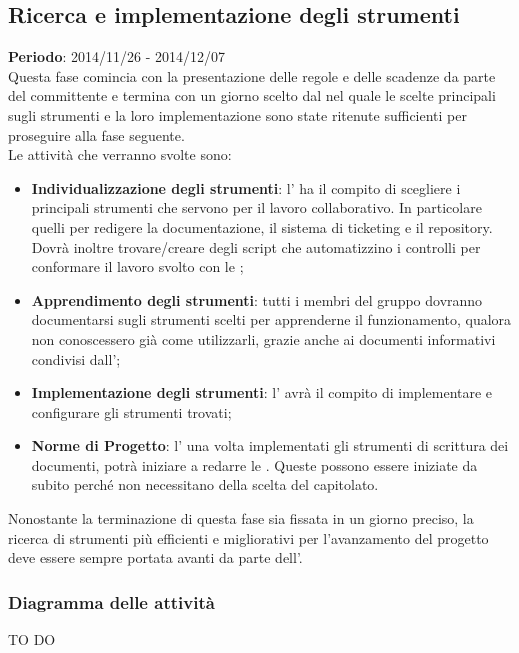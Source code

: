 	\subsection{Ricerca e implementazione degli strumenti} %
	\label{sub:ricerca_e_implementazione_degli_strumenti}
	\textbf{Periodo}: 2014/11/26 - 2014/12/07 \\
	Questa fase comincia con la presentazione delle regole e delle scadenze da parte del committente e termina con un giorno scelto dal \roleProjectManager{} nel quale le scelte principali sugli strumenti e la loro implementazione sono state ritenute sufficienti per proseguire alla fase seguente. \\
	Le attività che verranno svolte sono:
		\begin{itemize}
			\item \textbf{Individualizzazione degli strumenti}: l'\roleAdministrator{} ha il compito di scegliere i principali strumenti che servono per il lavoro collaborativo. In particolare quelli per redigere la documentazione, il sistema di ticketing e il repository. Dovrà inoltre trovare/creare degli script che automatizzino i controlli per conformare il lavoro svolto con le \docNameVersionNdP;
			\item \textbf{Apprendimento degli strumenti}: tutti i membri del gruppo dovranno documentarsi sugli strumenti scelti per apprenderne il funzionamento, qualora non conoscessero già come utilizzarli, grazie anche ai documenti informativi condivisi dall'\roleAdministrator;
			\item \textbf{Implementazione degli strumenti}: l'\roleAdministrator{} avrà il compito di implementare e configurare gli strumenti trovati;
			\item \textbf{Norme di Progetto}: l'\roleAdministrator{} una volta implementati gli strumenti di scrittura dei documenti, potrà iniziare a redarre le \docNameVersionNdP{}. Queste possono essere iniziate da subito perché non necessitano della scelta del capitolato.
		\end{itemize}
	\noindent
	Nonostante la terminazione di questa fase sia fissata in un giorno preciso, la ricerca di strumenti più efficienti e migliorativi per l'avanzamento del progetto deve essere sempre portata avanti da parte dell'\roleAdministrator.
	 
		\subsubsection{Diagramma delle attività} %
		\label{ssub:diagramma_delle_attivita}
		TO DO
	
